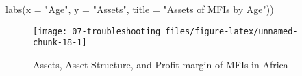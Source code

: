 \documentclass[a4paper,nobind]{templates/ociamthesis}
\newenvironment{Shaded}{\begin{snugshade}}{\end{snugshade}}
\newcommand{\AttributeTok}[1]{\textcolor[rgb]{0.77,0.63,0.00}{#1}}
\newcommand{\FunctionTok}[1]{\textcolor[rgb]{0.00,0.00,0.00}{#1}}
\newcommand{\NormalTok}[1]{#1}
\newcommand{\StringTok}[1]{\textcolor[rgb]{0.31,0.60,0.02}{#1}}
\renewenvironment{Shaded}
{
  \vspace{10pt}%
  \begin{snugshade}%
}{%
  \end{snugshade}%
  \vspace{8pt}%
}
\begin{document}
\begin{landscape}
\begin{Shaded}
\begin{Highlighting}[]
  \FunctionTok{labs}\NormalTok{(}\AttributeTok{x =} \StringTok{"Age"}\NormalTok{, }\AttributeTok{y =} \StringTok{"Assets"}\NormalTok{, }\AttributeTok{title =} \StringTok{"Assets of MFIs by Age"}\NormalTok{)) }
\end{Highlighting}
\end{Shaded}

\begin{figure}

{\centering \texttt{[image: 07-troubleshooting\_files/figure-latex/unnamed-chunk-18-1]} 

}

\caption{Assets, Asset Structure, and Profit margin of MFIs in Africa}\label{fig:unnamed-chunk-18}
\end{figure}

\end{landscape}
\end{document}
